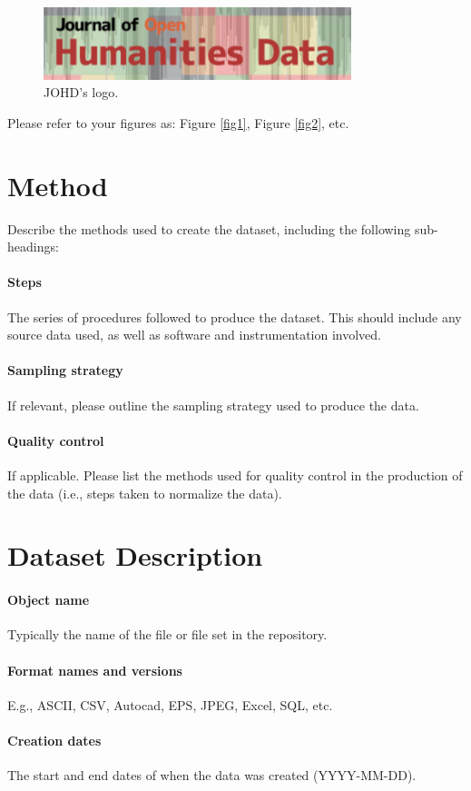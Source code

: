 \documentclass{article}
\begin{document}
\begin{figure}[H]
\centering
\includegraphics[width=0.8\textwidth]{images/image.jpg}
\caption{\label{fig3}JOHD's logo.}
\end{figure}

\noindent Please refer to your figures as: Figure \ref{fig1}, Figure \ref{fig2}, etc.

\section{Method}
Describe the methods used to create the dataset, including the following sub-headings:
\paragraph{Steps} The series of procedures followed to produce the dataset. This should include any source data used, as well as software and instrumentation involved.
\paragraph{Sampling strategy} If relevant, please outline the sampling strategy used to produce the data.
\paragraph{Quality control} If applicable. Please list the methods used for quality control in the production of the data (i.e., steps taken to normalize the data).

\section{Dataset Description}
\paragraph{Object name} Typically the name of the file or file set in the repository.
\paragraph{Format names and versions} E.g., ASCII, CSV, Autocad, EPS, JPEG, Excel, SQL, etc.
\paragraph{Creation dates} The start and end dates of when the data was created (YYYY-MM-DD).
\end{document}
